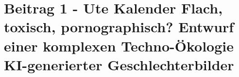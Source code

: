 \section*{Beitrag 1 - Ute Kalender
Flach, toxisch, pornographisch? Entwurf einer komplexen Techno-Ökologie KI-generierter Geschlechterbilder}

